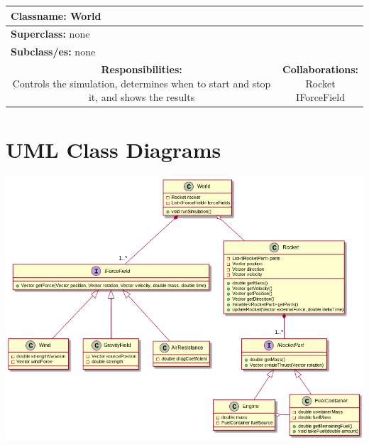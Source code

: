 \documentclass{article}
\begin{document}
\begin {center}
\begin{tabular}{|c|c|}
\hline
\multicolumn{2}{|l|}{\textbf{Classname:} World}\\
\hline
\multicolumn{2}{|l|}{\textbf{Superclass:} none}\\
\multicolumn{2}{|l|}{\textbf{Subclass/es:} none}\\
\hline
\parbox[]{5cm}{\vspace{3px}\textbf{Responsibilities:} \\Controls the simulation, determines when to start and stop it, and shows the results\vspace{3px}} & \parbox[]{5cm}{\textbf{Collaborations:}\\Rocket\\IForceField}\\
\hline
 \end{tabular}\vspace{.4cm}

\end{center}

\section{UML Class Diagrams}
\includegraphics[width=17cm,center]{uml_diagram.png}
\end{document}
